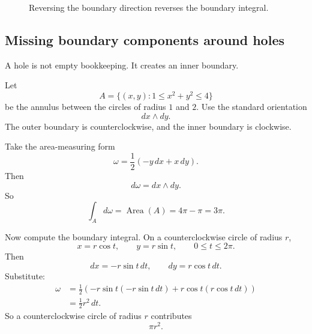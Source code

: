 \begin{figure}[h]
\centering
{}
\caption{Reversing the boundary direction reverses the boundary integral.}
\end{figure}

\subsection{Missing boundary components around holes}

A hole is not empty bookkeeping.  It creates an inner boundary.

Let
\[
    A=\{(x,y):1\le x^2+y^2\le4\}
\]
be the annulus between the circles of radius \(1\) and \(2\).  Use the standard
orientation
\[
    dx\wedge dy.
\]
The outer boundary is counterclockwise, and the inner boundary is clockwise.

Take the area-measuring form
\[
    \omega=\frac12(-y\,dx+x\,dy).
\]
Then
\[
    d\omega=dx\wedge dy.
\]
So
\[
    \int_A d\omega
    =
    \operatorname{Area}(A)
    =
    4\pi-\pi
    =
    3\pi.
\]

Now compute the boundary integral.  On a counterclockwise circle of radius \(r\),
\[
    x=r\cos t,
    \qquad
    y=r\sin t,
    \qquad
    0\le t\le2\pi.
\]
Then
\[
    dx=-r\sin t\,dt,
    \qquad
    dy=r\cos t\,dt.
\]
Substitute:
\[
\begin{aligned}
    \omega
    &=
    \frac12\left(
    -r\sin t(-r\sin t\,dt)
    +
    r\cos t(r\cos t\,dt)
    \right)\\
    &=
    \frac12r^2\,dt.
\end{aligned}
\]
So a counterclockwise circle of radius \(r\) contributes
\[
    \pi r^2.
\]

